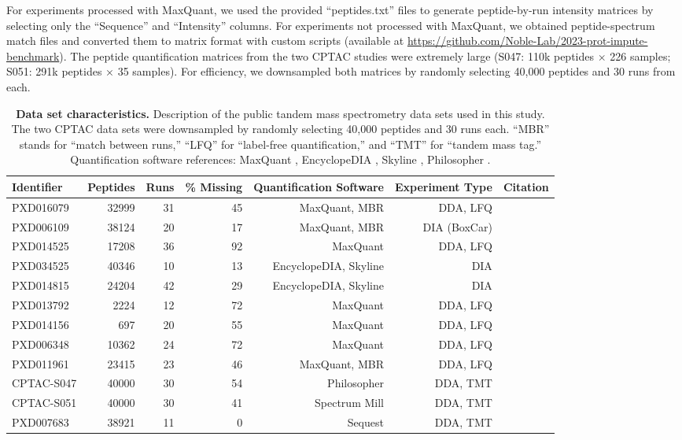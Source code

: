\documentclass{article}
\begin{document}
For experiments processed with MaxQuant, we used the provided ``peptides.txt'' files to generate peptide-by-run intensity matrices by selecting only the ``Sequence'' and ``Intensity'' columns. For experiments not processed with MaxQuant, we obtained peptide-spectrum match files and converted them to matrix format with custom scripts (available at \url{https://github.com/Noble-Lab/2023-prot-impute-benchmark}). The peptide quantification matrices from the two CPTAC studies were extremely large (S047: 110k peptides $\times$ 226 samples; S051: 291k peptides $\times$ 35 samples). For efficiency, we downsampled both matrices by randomly selecting 40,000 peptides and 30 runs from each.

\begin{table}
  \centering
  \normalsize
  \begin{tabular}{lrrrrrr}
    \hline
    Identifier & Peptides & Runs & \% Missing & Quantification Software & Experiment Type & Citation \\
    \hline
    PXD016079 & 32999 & 31 & 45 & MaxQuant, MBR & DDA, LFQ & \cite{pxd016079} \\
    PXD006109 & 38124 & 20 & 17 & MaxQuant, MBR & DIA (BoxCar) & \cite{pxd006109} \\
    PXD014525 & 17208 & 36 & 92 & MaxQuant & DDA, LFQ & \cite{pxd014525} \\
    PXD034525 & 40346 & 10 & 13 & EncyclopeDIA, Skyline & DIA & \cite{smtg-maccoss} \\
    PXD014815 & 24204 & 42 & 29 & EncyclopeDIA, Skyline & DIA & \cite{matrix-matched-calib} \\
    PXD013792 & 2224 & 12 & 72 & MaxQuant & DDA, LFQ & \cite{pxd013792} \\
    PXD014156 & 697 & 20 & 55 & MaxQuant & DDA, LFQ & \cite{pxd014156} \\
    PXD006348 & 10362 & 24 & 72 & MaxQuant & DDA, LFQ & \cite{pxd006348} \\
    PXD011961 & 23415 & 23 & 46 & MaxQuant, MBR & DDA, LFQ & \cite{pxd011961} \\
    CPTAC-S047 & 40000 & 30 & 54 & Philosopher & DDA, TMT & \cite{CPTAC-S047} \\
    CPTAC-S051 & 40000 & 30 & 41 & Spectrum Mill & DDA, TMT & \cite{CPTAC-S051} \\
    PXD007683 & 38921 & 11 & 0 & Sequest & DDA, TMT & \cite{pxd007683} \\
    \hline
  \end{tabular}
  \caption{{\bf Data set characteristics.} Description of the public tandem mass spectrometry data sets used in this study. The two CPTAC data sets were downsampled by randomly selecting 40,000 peptides and 30 runs each. ``MBR'' stands for ``match between runs,'' ``LFQ'' for ``label-free quantification,'' and ``TMT'' for ``tandem mass tag.'' Quantification software references: MaxQuant \cite{MaxQuant}, EncyclopeDIA \cite{chromatogram-DIA}, Skyline \cite{skyline}, Philosopher \cite{philosopher}.
    \label{tab:data-description}}
\end{table}
\end{document}
